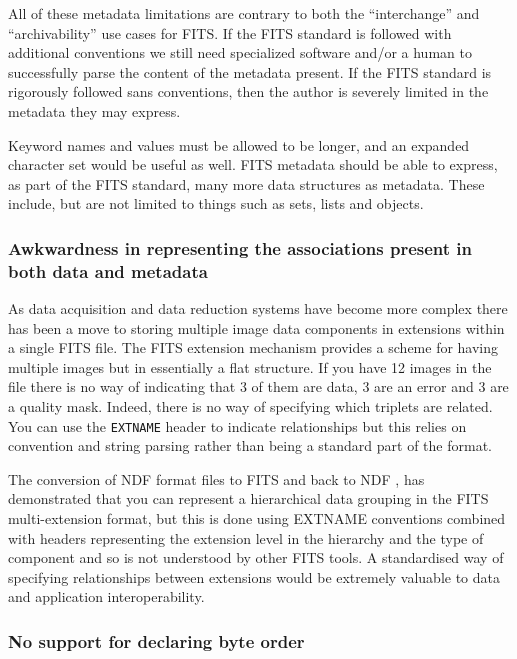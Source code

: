 \documentclass[final,authoryear,5p,times,twocolumn]{elsarticle}
\begin{document}
All of these metadata limitations are contrary to both the
``interchange'' and ``archivability'' use cases for FITS. If the FITS
standard is followed with additional conventions we still need
specialized software and/or a human to successfully parse the content
of the metadata present. If the FITS standard is rigorously followed
sans conventions, then the author is severely limited in the metadata
they may express.


Keyword names and values must be allowed to be longer, and an expanded
character set would be useful as well. FITS metadata should be able to
express, as part of the FITS standard, many more data structures as
metadata. These include, but are not limited to things such as sets,
lists and objects.


\subsubsection{Awkwardness in representing the associations present in both data and metadata}


As data acquisition and data reduction systems have become more
complex there has been a move to storing multiple image data
components in extensions within a single FITS file. The FITS
extension mechanism provides a scheme for having multiple images but
in essentially a flat structure. If you have 12 images in the file
there is no way of indicating that 3 of them are data, 3 are an error
and 3 are a quality mask. Indeed, there is no way of specifying which
triplets are related. You can use the \texttt{EXTNAME} header to indicate
relationships but this relies on convention and string parsing rather
than being a standard part of the format.


The conversion of NDF format files to FITS and back to NDF
\citep{SUN55,1997STARB..19...14C}, has demonstrated that you can
represent a hierarchical data grouping in the FITS multi-extension
format, but this is done using EXTNAME conventions combined with
headers representing the extension level in the hierarchy and the type
of component and so is not understood by other FITS tools. A
standardised way of specifying relationships between extensions would
be extremely valuable to data and application interoperability.


\subsubsection{No support for declaring byte order}
\end{document}
